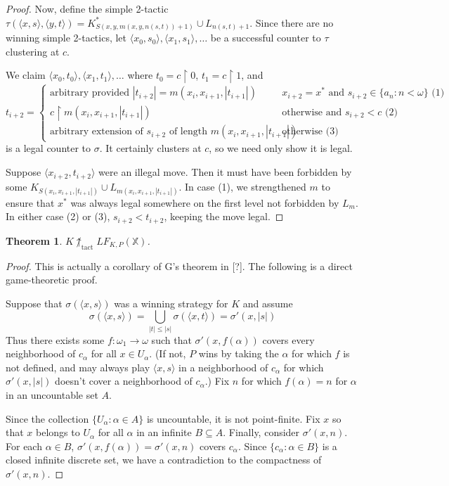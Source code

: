 \documentclass[11pt]{article}
\theoremstyle{plain}
\newtheorem{theorem}{Theorem}
\theoremstyle{definition}
\theoremstyle{remark}
\newcommand{\tactwin}{\uparrow_{\text{tact}}}
\newcommand{\lfkpgame}[1]{LF_{K,P}(#1)}
\newcommand{\<}{\langle}
\renewcommand{\>}{\rangle}
\newcommand{\rest}{\restriction}
\begin{document}
{\begin{proof}
Now, define the simple 2-tactic $\tau(\<x,s\>,\<y,t\>)=K^*_{S(x,y,m(x,y,n(s,t))+1)} \cup L_{n(s,t)+1}$. Since there are no winning simple 2-tactics, let $\<x_0,s_0\>,\<x_1,s_1\>,\dots$ be a successful counter to $\tau$ clustering at $c$.

We claim $\<x_0,t_0\>, \<x_1,t_1\>, \dots$ where $t_0=c\rest 0$, $t_1=c\rest 1$, and
$$
t_{i+2} = \left\{
\begin{array}{ll}
\text{arbitrary provided } |t_{i+2}| = m(x_i,x_{i+1},|t_{i+1}|) & x_{i+2}= x^* \text{ and } s_{i+2} \in \{a_n : n < \omega\} \text{ (1) } \\
c\rest m(x_i,x_{i+1},|t_{i+1}|) & \text{otherwise and } s_{i+2} < c  \text{ (2) }\\
\text{arbitrary extension of } s_{i+2} \text{ of length } m(x_i,x_{i+1},|t_{i+1}|) & \text{otherwise} \text{ (3) }
\end{array}
\right.
$$
is a legal counter to $\sigma$. It certainly clusters at $c$, so we need only show it is legal.

Suppose $\<x_{i+2}, t_{i+2}\>$ were an illegal move. Then it must have been forbidden by some $K_{S(x_i,x_{i+1},|t_{i+1}|)}\cup L_{m(x_i,x_{i+1},|t_{i+1}|)}$. In case (1), we strengthened $m$ to ensure that $x^*$ was always legal somewhere on the first level not forbidden by $L_m$. In either case (2) or (3), $s_{i+2}<t_{i+2}$, keeping the move legal.

\end{proof}
}


\begin{theorem}
$K\not\tactwin\lfkpgame{\mathbb{X}}$.
\end{theorem}

\begin{proof}
This is actually a corollary of G's theorem in [?]. The following is a direct game-theoretic proof.

Suppose that $\sigma(\<x,s\>)$ was a winning strategy for $K$ and assume 
  \[
    \sigma(\<x,s\>) = \bigcup_{|t|\leq |s|} \sigma(\<x,t\>) = \sigma'(x,|s|)
  \]
Thus there exists some $f: \omega_1 \to \omega$ such that $\sigma'(x,f(\alpha))$ covers every neighborhood of $c_\alpha$ for all $x\in U_\alpha$. (If not, $P$ wins by taking the $\alpha$ for which $f$ is not defined, and may always play $\<x,s\>$ in a neighborhood of $c_\alpha$ for which $\sigma'(x,|s|)$ doesn't cover a neighborhood of $c_\alpha$.) Fix $n$ for which $f(\alpha)=n$ for $\alpha$ in an uncountable set $A$.

Since the collection $\{U_\alpha : \alpha \in A\}$ is uncountable, it is not point-finite. Fix $x$ so that $x$ belongs to $U_\alpha$ for all $\alpha$ in an infinite $B \subseteq A$. Finally, consider $\sigma'(x,n)$. For each $\alpha\in B$, $\sigma'(x,f(\alpha))=\sigma'(x,n)$ covers $c_\alpha$. Since $\{c_\alpha : \alpha \in B\}$ is a closed infinite discrete set, we have a contradiction to the compactness of $\sigma'(x,n)$.
\end{proof}
\end{document}
